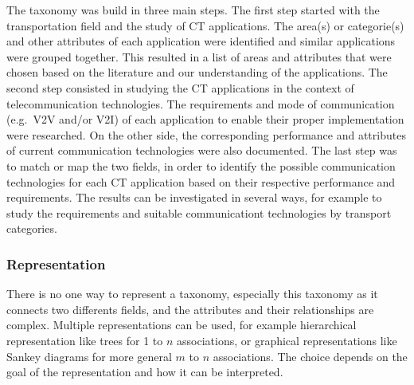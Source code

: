 The taxonomy was build in three main steps. The first step started with the transportation field and the study of \acrshort{CT} applications. The area(s) or categorie(s) and other attributes of each application were identified and similar applications were grouped together. This resulted in a list of areas and attributes that were chosen based on the literature and our understanding of the applications. 
The second step consisted in studying the \acrshort{CT} applications in the context of telecommunication technologies. The requirements and mode of communication (e.g.\ \acrshort{V2V} and/or \acrshort{V2I}) of each application to enable their proper implementation were researched. On the other side, the corresponding performance and attributes of current communication technologies were also documented. 
The last step was to match or map the two fields, in order to identify the possible communication technologies for each \acrshort{CT} application based on their respective performance and requirements. The results can be investigated in several ways, for example to study the requirements and suitable communicationt technologies by transport categories. 

\subsubsection{Representation}
There is no one way to represent a taxonomy, especially this taxonomy as it connects two differents fields, and the attributes and their relationships are complex.
Multiple representations can be used, for example hierarchical representation like trees for 1 to $n$ associations, or graphical representations like Sankey diagrams for more general $m$ to $n$ associations. The choice depends on the goal of the representation and how it can be interpreted. 

